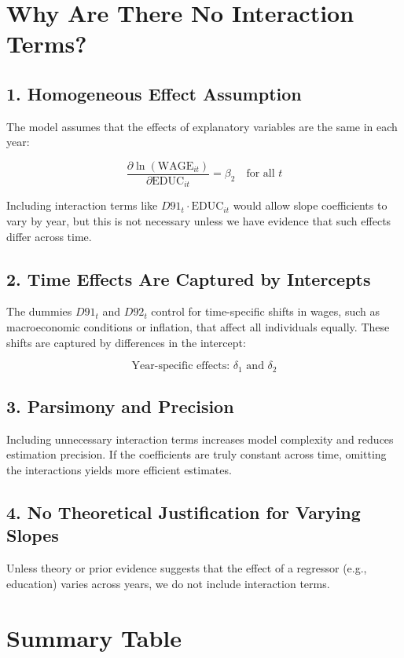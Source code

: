 \documentclass[12pt, oneside]{article}
\begin{document}
\section*{Why Are There No Interaction Terms?}

\subsection*{1. Homogeneous Effect Assumption}

The model assumes that the effects of explanatory variables are the same in each year:

\[
\frac{\partial \ln(\text{WAGE}_{it})}{\partial \text{EDUC}_{it}} = \beta_2 \quad \text{for all } t
\]

Including interaction terms like \( D91_t \cdot \text{EDUC}_{it} \) would allow slope coefficients to vary by year, but this is not necessary unless we have evidence that such effects differ across time.

\subsection*{2. Time Effects Are Captured by Intercepts}

The dummies \( D91_t \) and \( D92_t \) control for time-specific shifts in wages, such as macroeconomic conditions or inflation, that affect all individuals equally. These shifts are captured by differences in the intercept:

\[
\text{Year-specific effects: } \delta_1 \text{ and } \delta_2
\]

\subsection*{3. Parsimony and Precision}

Including unnecessary interaction terms increases model complexity and reduces estimation precision. If the coefficients are truly constant across time, omitting the interactions yields more efficient estimates.

\subsection*{4. No Theoretical Justification for Varying Slopes}

Unless theory or prior evidence suggests that the effect of a regressor (e.g., education) varies across years, we do not include interaction terms.

\section*{Summary Table}
\end{document}
